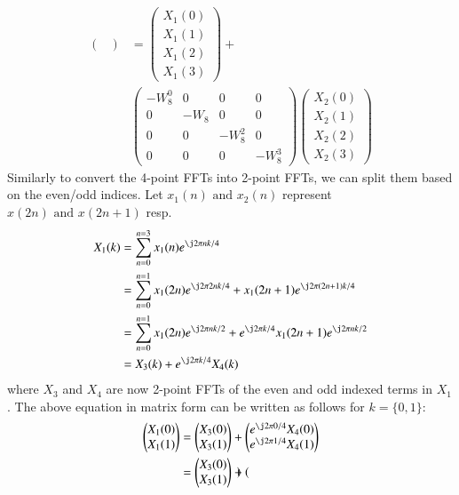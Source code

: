 \documentclass[journal,12pt,twocolumn]{IEEEtran}
\renewcommand\thesection{\arabic{section}}
\begin{document}
\begin{enumerate}[label=\arabic*.,ref=\thesection.\theenumi]
\begin{align}
\begin{pmatrix}
    \end{pmatrix}&=\begin{pmatrix}
    X_1(0)\\X_1(1)\\X_1(2)\\X_1(3)
    \end{pmatrix} +\nonumber
    \\&\begin{pmatrix}
    -W_8^0&0&0&0\\
    0&-W_8&0&0\\
    0&0&-W_8^2&0\\
    0&0&0&-W_8^3
    \end{pmatrix}
    \begin{pmatrix}
    X_2(0)\\X_2(1)\\X_2(2)\\X_2(3)
    \end{pmatrix}
\end{align}
Similarly to convert the 4-point FFTs into 2-point FFTs, we can split them based on the even/odd indices. Let $x_1(n) \text{ and } x_2(n)$ represent $x(2n) \text{ and } x(2n+1)$ resp.
\begin{align}
    X_1(k) &= \sum_{n=0}^{n=3}x_1(n)e^{\j2\pi nk/4}\\
    &=\sum_{n=0}^{n=1}x_1(2n)e^{\j2\pi 2nk/4}+x_1(2n+1)e^{\j2\pi (2n+1)k/4}\\
    &= \sum_{n=0}^{n=1}x_1(2n)e^{\j2\pi nk/2}+e^{\j2\pi k/4}x_1(2n+1)e^{\j2\pi nk/2}\\
    &= X_3(k)+e^{\j2\pi k/4}X_4(k)
\end{align}
where $X_3$ and $X_4$ are now 2-point FFTs of the even and odd indexed terms in $X_1$. The above equation in matrix form can be written as follows for $k=\{0,1\}$:
\begin{align}
\begin{pmatrix}
X_1(0)\\X_1(1)
\end{pmatrix}&=\begin{pmatrix}
X_3(0)\\X_3(1)
\end{pmatrix}+\begin{pmatrix}
e^{\j2\pi 0/4}X_4(0)\\
e^{\j2\pi 1/4}X_4(1)
\end{pmatrix}\\
&= \begin{pmatrix}
X_3(0)\\X_3(1)
\end{pmatrix}+\begin{pmatrix}

\end{pmatrix}
\end{align}
\end{enumerate}
\end{document}
